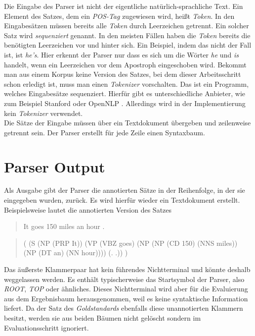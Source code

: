 Die Eingabe des Parser ist nicht der eigentliche natürlich-sprachliche Text. Ein Element des Satzes, dem ein \textit{POS-Tag} zugewiesen wird, heißt \textit{Token}. In den Eingabesätzen müssen bereits alle \textit{Token} durch Leerzeichen getrennt. Ein solcher Satz wird \textit{sequenziert} genannt. In den meisten Fällen haben die \textit{Token} bereits die benötigten Leerzeichen vor und hinter sich. Ein Beispiel, indem das nicht der Fall ist, ist \textit{he's}. Hier erkennt der Parser nur dass es sich um die Wörter \textit{he} und \textit{is} handelt, wenn ein Leerzeichen vor dem Apostroph eingeschoben wird. Bekommt man aus einem Korpus keine Version des Satzes, bei dem dieser Arbeitsschritt schon erledigt ist, muss man einen \textit{Tokenizer} vorschalten. Das ist ein Programm, welches Eingabesätze sequenziert. Hierfür gibt es unterschiedliche Anbieter, wie zum Beispiel Stanford \cite{stanfordTokenizer} oder OpenNLP \cite{openNlpManual}. %
Allerdings wird in der Implementierung kein \textit{Tokenizer} verwendet. \\
Die Sätze der Eingabe müssen über ein Textdokument übergeben und zeilenweise getrennt sein. Der Parser erstellt für jede Zeile einen Syntaxbaum.

\section{Parser Output}
Als Ausgabe gibt der Parser die annotierten Sätze in der Reihenfolge, in der sie eingegeben wurden, zurück. Es wird hierfür wieder ein Textdokument erstellt. %
Beispielsweise lautet die annotierten Version des Satzes
\begin{quote}
It goes 150 miles an hour .
\end{quote}
\begin{quote}
( (S (NP (PRP It)) (VP (VBZ goes) (NP (NP (CD 150) (NNS miles)) \\(NP (DT an) (NN hour)))) (. .)) )
\end{quote}
Das äußerste Klammerpaar hat kein führendes Nichtterminal und könnte deshalb weggelassen werden. Es enthält typischerweise das Startsymbol der Parser, also \textit{ROOT}, \textit{TOP} oder ähnliches. Dieses Nichtterminal wird aber für die Evaluierung aus dem Ergebnisbaum herausgenommen, weil es keine syntaktische Information liefert. Da der Satz des \textit{Goldstandards} ebenfalls diese unannotierten Klammern besitzt, werden sie aus beiden Bäumen nicht gelöscht sondern im Evaluationsschritt ignoriert.

